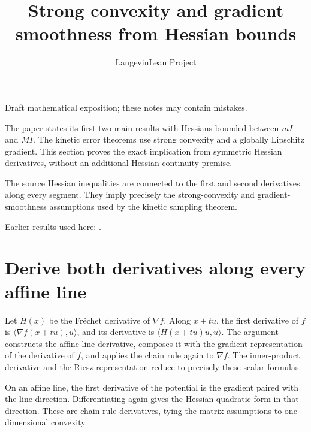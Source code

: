 \documentclass[11pt,a4paper]{article}
\title{\texorpdfstring{Strong convexity and gradient smoothness from Hessian bounds}{Strong convexity and gradient smoothness from Hessian bounds}}
\author{LangevinLean Project}
\date{}
\begin{document}
\maketitle
Draft mathematical exposition; these notes may contain mistakes.


The paper states its first two main results with Hessians bounded between \(mI\) and \(MI\). The kinetic error theorems use strong convexity and a globally Lipschitz gradient. This section proves the exact implication from symmetric Hessian derivatives, without an additional Hessian-continuity premise.



The source Hessian inequalities are connected to the first and second derivatives along every segment. They imply precisely the strong-convexity and gradient-smoothness assumptions used by the kinetic sampling theorem.



Earlier results used here: \cite[Section~3.2]{LangevinLean2026ULASC}.

\section{\texorpdfstring{Derive both derivatives along every affine line}{Derive both derivatives along every affine line}}


Let \(H(x)\) be the Fréchet derivative of \(\nabla f\). Along \(x+tu\), the first derivative of \(f\) is \(\langle\nabla f(x+tu),u\rangle\), and its derivative is \(\langle H(x+tu)u,u\rangle\). The argument constructs the affine-line derivative, composes it with the gradient representation of the derivative of \(f\), and applies the chain rule again to \(\nabla f\). The inner-product derivative and the Riesz representation reduce to precisely these scalar formulas.



On an affine line, the first derivative of the potential is the gradient paired with the line direction. Differentiating again gives the Hessian quadratic form in that direction. These are chain-rule derivatives, tying the matrix assumptions to one-dimensional convexity.
\end{document}
